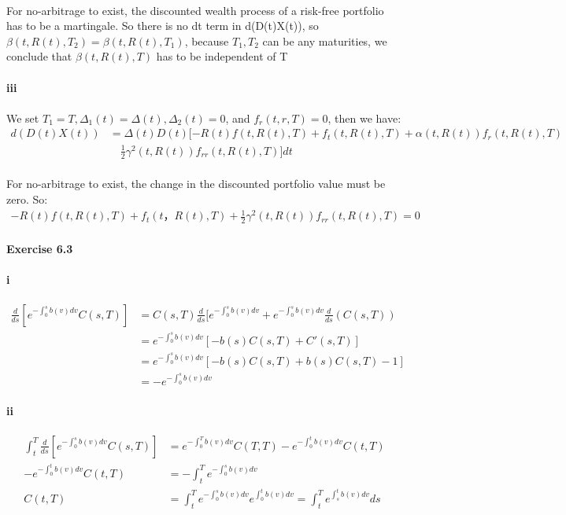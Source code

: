 \documentclass{article}
\begin{document}
\paragraph{}{For no-arbitrage to exist, the discounted wealth process of a risk-free portfolio has to be a martingale. So there is no dt term in d(D(t)X(t)), so $\beta(t,R(t),T_2)=\beta(t,R(t),T_1)$, because $T_1,T_2 $ can be any maturities, we conclude that $\beta(t,R(t),T)$ has to be independent of T}
\paragraph{iii}
\paragraph{}{We set $T_1=T, \Delta_1(t)=\Delta(t),\Delta_2(t)=0$, and $f_r(t,r,T)=0$, then we have:}
\begin{align*}
  d(D(t)X(t)) & = \Delta(t)D(t)[-R(t)f(t,R(t),T)+f_t(t,R(t),T)+\alpha(t,R(t))f_r(t,R(t),T)\\
  &\quad \frac{1}{2}\gamma^2(t,R(t))f_{rr}(t,R(t),T)]dt
\end{align*}
\paragraph{}{For no-arbitrage to exist, the change in the discounted portfolio value must be zero. So:}
\begin{align*}
  -R(t)f(t,R(t),T)+f_t(t，R(t),T)+\frac{1}{2}\gamma^2(t,R(t))f_{rr}(t,R(t),T)=0
\end{align*}
\paragraph{Exercise 6.3}
\paragraph{i}
\begin{align*}
  \frac{d}{ds}[e^{-\int_{0}^{s}b(v)dv}C(s,T)] & =  C(s,T)\frac{d}{ds}[e^{-\int_{0}^{s}b(v)dv}+e^{-\int_{0}^{s}b(v)dv }\frac{d}{ds}(C(s,T))\\
  & = e^{-\int_{0}^{s}b(v)dv}[-b(s)C(s,T)+C'(s,T)]\\
  & = e^{-\int_{0}^{s}b(v)dv}[-b(s)C(s,T)+b(s)C(s,T)-1]\\
  & =-e^{-\int_{0}^{s}b(v)dv}
\end{align*}
\paragraph{ii}
\begin{align*}
  \int_{t}^{T}\frac{d}{ds}[e^{-\int_{0}^{s}b(v)dv}C(s,T)] &=
  e^{-\int_{0}^{T}b(v)dv}C(T,T)-e^{-\int_{0}^{t}b(v)dv}C(t,T)\\
  -e^{-\int_{0}^{t}b(v)dv}C(t,T) &=-\int_{t}^{T}
  e^{-\int_{0}^{s}b(v)dv} \\
  C(t,T) & =\int_{t}^{T}
  e^{-\int_{0}^{s}b(v)dv}e^{\int_{0}^{t}b(v)dv}=\int_{t}^{T}e^{\int_{s}^{t}b(v)dv}ds
\end{align*}
\end{document}
